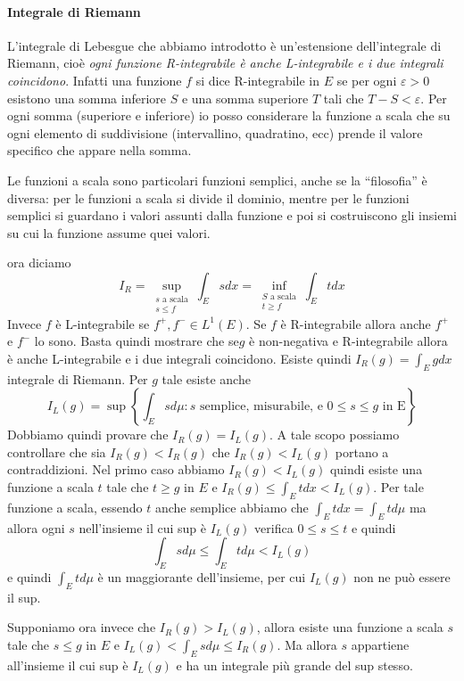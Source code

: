 \paragraph{Integrale di Riemann} L'integrale di Lebesgue che abbiamo introdotto
è un'estensione dell'integrale di Riemann, cioè \emph{ogni funzione
R-integrabile è anche L-integrabile e i due integrali coincidono}. Infatti una
funzione \(f\) si dice R-integrabile in \(E\) se per ogni \(\varepsilon>0\)
esistono una somma inferiore \(S\) e una somma superiore \(T\) tali che \(T-S <
\varepsilon\). Per ogni somma (superiore e inferiore) io posso considerare la
funzione a scala che su ogni elemento di suddivisione (intervallino, quadratino,
ecc) prende il valore specifico che appare nella somma.
\begin{remark}
    Le funzioni a scala sono particolari funzioni semplici, anche se la
    ``filosofia'' è diversa: per le funzioni a scala si divide il dominio,
    mentre per le funzioni semplici si guardano i valori assunti dalla funzione
    e poi si costruiscono gli insiemi su cui la funzione assume quei valori.
\end{remark}
ora diciamo 
\[
    I_R = \sup_{\substack{s\text{ a scala} \\ s \le f}} \int_{E} s dx = 
    \inf_{\substack{S\text{ a scala} \\ t \ge f}} \int_{E} t dx
\]
Invece \(f\) è L-integrabile se \(f^{+}, f^{-} \in L^{1}{(E)}\). Se \(f\) è
R-integrabile allora anche \(f^{+}\) e \(f^{-}\) lo sono. Basta quindi mostrare
che se\(g\) è non-negativa e R-integrabile allora è anche L-integrabile e i due
integrali coincidono. Esiste quindi \(I_R{(g)} = \int_{E} g dx\) integrale di
Riemann. Per \(g\) tale esiste anche \[I_L{(g)} = \sup \left\{\int_E s d\mu : s
\text{ semplice, misurabile, e } 0\le s\le g \text{ in E} \right\} \] Dobbiamo
quindi provare che \(I_R{(g)} = I_L{(g)}\). A tale scopo possiamo controllare
che sia \(I_R{(g)} < I_R{(g)}\) che \(I_R{(g)} < I_L{(g)}\) portano a
contraddizioni. Nel primo caso abbiamo \(I_R{(g)} < I_L{(g)}\) quindi esiste una
funzione a scala \(t\) tale che \(t \ge g\) in \(E\) e \(I_R{(g)} \le  \int_E t dx
< I_L{(g)}\). Per tale funzione a scala, essendo \(t\) anche semplice abbiamo
che \(\int_E t dx = \int_E t d\mu\) ma allora ogni \(s\) nell'insieme il cui sup
è \(I_L{(g)}\) verifica \(0 \le s\le t\) e quindi
\[
    \int_E s d\mu \le \int_E t d\mu < I_L{(g)}
\]
e quindi \(\int_E t d\mu\) è un maggiorante dell'insieme, per cui \(I_L{(g)}\)
non ne può essere il sup.

Supponiamo ora invece che \(I_R{(g)} > I_L{(g)}\), allora esiste una funzione a
scala \(s\) tale che \(s \le g\) in \(E\) e \(I_L{(g)} < \int_E s d\mu \le
I_R{(g)}\). Ma allora \(s\) appartiene all'insieme il cui sup è \(I_L{(g)}\) e
ha un integrale più grande del sup stesso. 

